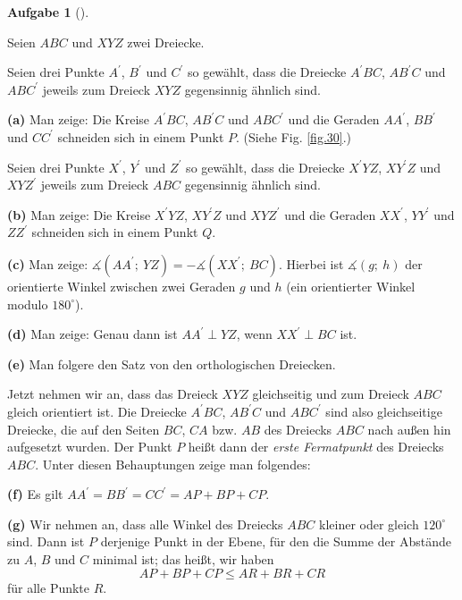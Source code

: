 \documentclass[12pt,final,notitlepage,onecolumn,german]{article}%
\newcounter{exer}
\theoremstyle{definition}
\newtheorem{exmp}[exer]{Aufgabe}
\newenvironment{exercise}[1][]
{\begin{exmp}[#1]\begin{leftbar}}
{\end{leftbar}\end{exmp}}
\theoremstyle{plainsl}
\begin{document}
\begin{exercise}
\label{aufg.double-staerk}Seien $ABC$ und $XYZ$ zwei Dreiecke.

Seien drei Punkte $A^{\prime}$, $B^{\prime}$ und $C^{\prime}$ so gew\"{a}hlt,
dass die Dreiecke $A^{\prime}BC$, $AB^{\prime}C$ und $ABC^{\prime}$ jeweils
zum Dreieck $XYZ$ gegensinnig \"{a}hnlich sind.

\textbf{(a)} Man zeige: Die Kreise $A^{\prime}BC$, $AB^{\prime}C$ und
$ABC^{\prime}$ und die Geraden $AA^{\prime}$, $BB^{\prime}$ und $CC^{\prime}$
schneiden sich in einem Punkt $P$. (Siehe Fig. \ref{fig.30}.)

Seien drei Punkte $X^{\prime}$, $Y^{\prime}$ und $Z^{\prime}$ so gew\"{a}hlt,
dass die Dreiecke $X^{\prime}YZ$, $XY^{\prime}Z$ und $XYZ^{\prime}$ jeweils
zum Dreieck $ABC$ gegensinnig \"{a}hnlich sind.

\textbf{(b)} Man zeige: Die Kreise $X^{\prime}YZ$, $XY^{\prime}Z$ und
$XYZ^{\prime}$ und die Geraden $XX^{\prime}$, $YY^{\prime}$ und $ZZ^{\prime}$
schneiden sich in einem Punkt $Q$.

\textbf{(c)} Man zeige: $\measuredangle\left(  AA^{\prime};\ YZ\right)
=-\measuredangle\left(  XX^{\prime};\ BC\right)  $. Hierbei ist
$\measuredangle\left(  g;\ h\right)  $ der orientierte Winkel zwischen zwei
Geraden $g$ und $h$ (ein orientierter Winkel modulo $180^{\circ}$).

\textbf{(d)} Man zeige: Genau dann ist $AA^{\prime}\perp YZ$, wenn
$XX^{\prime}\perp BC$ ist.

\textbf{(e)} Man folgere den Satz von den orthologischen Dreiecken.

Jetzt nehmen wir an, dass das Dreieck $XYZ$ gleichseitig und zum Dreieck $ABC$
gleich orientiert ist. Die Dreiecke $A^{\prime}BC$, $AB^{\prime}C$ und
$ABC^{\prime}$ sind also gleichseitige Dreiecke, die auf den Seiten $BC$, $CA$
bzw. $AB$ des Dreiecks $ABC$ nach au\ss en hin aufgesetzt wurden. Der Punkt
$P$ hei\ss t dann der \emph{erste Fermatpunkt} des Dreiecks $ABC$. Unter
diesen Behauptungen zeige man folgendes:

\textbf{(f)} Es gilt $AA^{\prime}=BB^{\prime}=CC^{\prime}=AP+BP+CP$.

\textbf{(g)} Wir nehmen an, dass alle Winkel des Dreiecks $ABC$ kleiner oder
gleich $120^{\circ}$ sind. Dann ist $P$ derjenige Punkt in der Ebene, f\"{u}r
den die Summe der Abst\"{a}nde zu $A$, $B$ und $C$ minimal ist; das hei\ss t,
wir haben%
\[
AP+BP+CP\leq AR+BR+CR
\]
f\"{u}r alle Punkte $R$.
\end{exercise}
\end{document}
